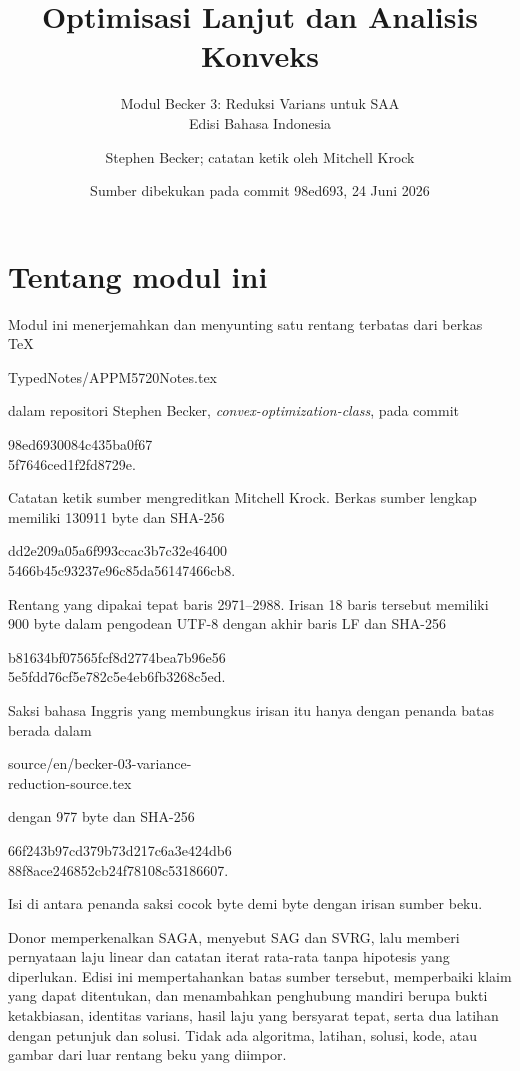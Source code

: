 \documentclass[indonesian]{shinybook}
\title{Optimisasi Lanjut dan Analisis Konveks}
\subtitle{Modul Becker 3: Reduksi Varians untuk SAA\\Edisi Bahasa Indonesia}
\author{Stephen Becker; catatan ketik oleh Mitchell Krock}
\date{Sumber dibekukan pada commit 98ed693, 24 Juni 2026}
\begin{document}
\maketitle

\frontmatter
\chapter*{Tentang modul ini}
Modul ini menerjemahkan dan menyunting satu rentang terbatas dari berkas TeX
\begin{center}\small\ttfamily
TypedNotes/APPM5720Notes.tex
\end{center}
dalam repositori Stephen Becker, \emph{convex-optimization-class}, pada commit
\begin{center}\small\ttfamily
98ed6930084c435ba0f67\\[-0.2em]
5f7646ced1f2fd8729e.
\end{center}
Catatan ketik sumber mengreditkan Mitchell Krock. Berkas sumber lengkap
memiliki 130911 byte dan SHA-256
\begin{center}\small\ttfamily
dd2e209a05a6f993ccac3b7c32e46400\\[-0.2em]
5466b45c93237e96c85da56147466cb8.
\end{center}

Rentang yang dipakai tepat baris 2971--2988. Irisan 18 baris tersebut memiliki
900 byte dalam pengodean UTF-8 dengan akhir baris LF dan SHA-256
\begin{center}\small\ttfamily
b81634bf07565fcf8d2774bea7b96e56\\[-0.2em]
5e5fdd76cf5e782c5e4eb6fb3268c5ed.
\end{center}
Saksi bahasa Inggris yang membungkus irisan itu hanya dengan penanda batas
berada dalam
\begin{center}\small\ttfamily
source/en/becker-03-variance-\\[-0.2em]
reduction-source.tex
\end{center}
dengan 977 byte dan SHA-256
\begin{center}\small\ttfamily
66f243b97cd379b73d217c6a3e424db6\\[-0.2em]
88f8ace246852cb24f78108c53186607.
\end{center}
Isi di antara penanda saksi cocok byte demi byte dengan irisan sumber beku.

Donor memperkenalkan SAGA, menyebut SAG dan SVRG, lalu memberi pernyataan laju
linear dan catatan iterat rata-rata tanpa hipotesis yang diperlukan. Edisi ini
mempertahankan batas sumber tersebut, memperbaiki klaim yang dapat ditentukan,
dan menambahkan penghubung mandiri berupa bukti ketakbiasan, identitas varians,
hasil laju yang bersyarat tepat, serta dua latihan dengan petunjuk dan solusi.
Tidak ada algoritma, latihan, solusi, kode, atau gambar dari luar rentang beku
yang diimpor.
\end{document}
